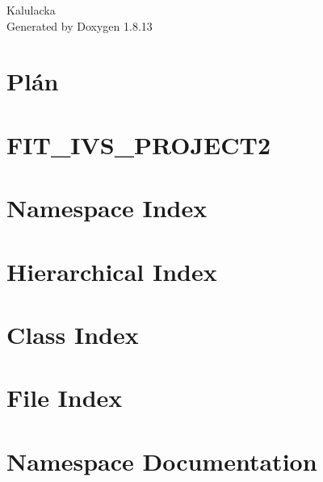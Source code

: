 \documentclass[twoside]{book}
\newcommand{\+}{\discretionary{\mbox{\scriptsize$\hookleftarrow$}}{}{}}
\newcommand{\clearemptydoublepage}{%
  \newpage{\pagestyle{empty}\cleardoublepage}%
}
\begin{document}
\hypersetup{pageanchor=false,
             bookmarksnumbered=true,
             pdfencoding=unicode
            }
\begin{titlepage}
\vspace*{7cm}
\begin{center}%
{\Large Kalulacka }\\
\vspace*{1cm}
{\large Generated by Doxygen 1.8.13}\\
\end{center}
\end{titlepage}
\clearemptydoublepage
{}
\tableofcontents
\clearemptydoublepage
{}
\hypersetup{pageanchor=true}

\chapter{Plán}
\label{md_plan_xcecha04_xmatla00_xmitur01_xslade21_plan}

\chapter{F\+I\+T\+\_\+\+I\+V\+S\+\_\+\+P\+R\+O\+J\+E\+C\+T2}
\label{md__r_e_a_d_m_e}

\chapter{Namespace Index}

\chapter{Hierarchical Index}

\chapter{Class Index}

\chapter{File Index}

\chapter{Namespace Documentation}



\end{document}
